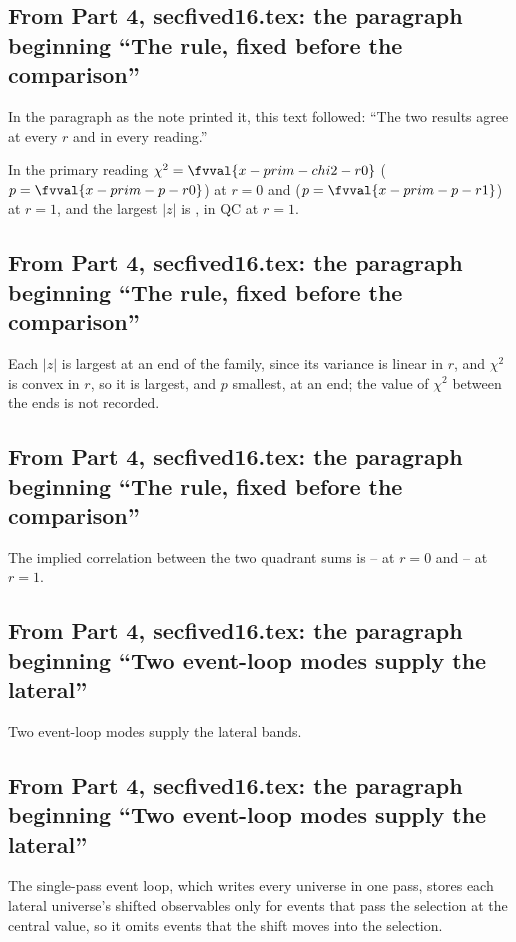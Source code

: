 \subsection{From Part 4, secfived16.tex: the paragraph beginning ``The rule, fixed before the comparison''}
In the paragraph as the note printed it, this text followed: ``The two results agree at every $r$ and in every reading.''\par
In the primary reading $\chi^2=\fvval{x-prim-chi2-r0}$ ($p=\fvval{x-prim-p-r0}$) at $r=0$ and  ($p=\fvval{x-prim-p-r1}$) at $r=1$, and the largest $|z|$ is , in QC at $r=1$.

\subsection{From Part 4, secfived16.tex: the paragraph beginning ``The rule, fixed before the comparison''}
Each $|z|$ is largest at an end of the family, since its variance is linear in $r$, and $\chi^2$ is convex in $r$, so it is largest, and $p$ smallest, at an end; the value of $\chi^2$ between the ends is not recorded.

\subsection{From Part 4, secfived16.tex: the paragraph beginning ``The rule, fixed before the comparison''}
The implied correlation between the two quadrant sums is -- at $r=0$ and -- at $r=1$.

\subsection{From Part 4, secfived16.tex: the paragraph beginning ``Two event-loop modes supply the lateral''}
Two event-loop modes supply the lateral bands.

\subsection{From Part 4, secfived16.tex: the paragraph beginning ``Two event-loop modes supply the lateral''}
The single-pass event loop, which writes every universe in one pass, stores each lateral universe's shifted observables only for events that pass the selection at the central value, so it omits events that the shift moves into the selection.

